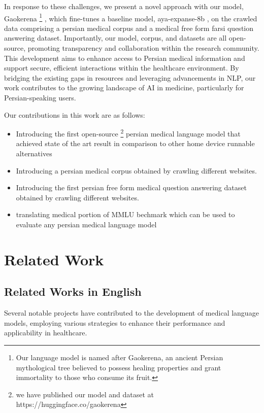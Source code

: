 \documentclass[conference]{IEEEtran}
\begin{document}
In response to these challenges, we present a novel approach with our model, Gaokerena
\footnote{
Our language model is named after Gaokerena, an ancient Persian mythological tree believed to possess healing properties and grant immortality to those who consume its fruit.
}
, which fine-tunes a baseline model, aya-expanse-8b
\cite{b5}
, on the crawled data comprising a persian medical corpus and a medical free form farsi question answering dataset. Importantly, our model, corpus, and datasets are all open-source, promoting transparency and collaboration within the research community. This development aims to enhance access to Persian medical information and support secure, efficient interactions within the healthcare environment. By bridging the existing gaps in resources and leveraging advancements in NLP, our work contributes to the growing landscape of AI in medicine, particularly for Persian-speaking users.

Our contributions in this work are as follows:
\begin{itemize}
	\item Introducing the first open-source
	\footnote{
	we have published our model and dataset at https://huggingface.co/gaokerena
	}
	persian medical language model that achieved state of the art result in
	comparison to other home device runnable alternatives
	\item Introducing a persian medical corpus obtained by crawling different websites.
	\item  Introducing the first persian free form medical question answering dataset obtained by crawling different websites.
	\item translating medical portion of MMLU bechmark which can be used to evaluate any persian medical language model
\end{itemize}

\section{Related Work}

\subsection{Related Works in English}
Several notable projects have contributed to the development of medical language models, employing various strategies to enhance their performance and applicability in healthcare.
\end{document}
